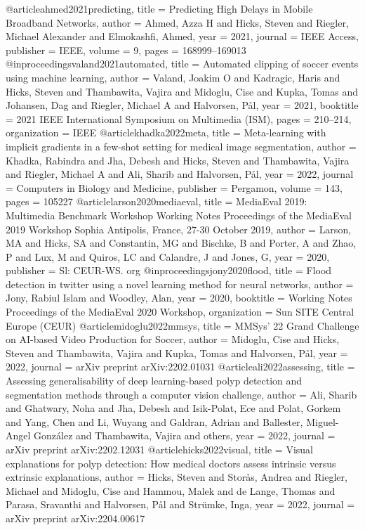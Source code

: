 @article{ahmed2021predicting,
	title = {Predicting High Delays in Mobile Broadband Networks},
	author = {Ahmed, Azza H and Hicks, Steven and Riegler, Michael Alexander and Elmokashfi, Ahmed},
	year = 2021,
	journal = {IEEE Access},
	publisher = {IEEE},
	volume = 9,
	pages = {168999--169013}
}
@inproceedings{valand2021automated,
	title = {Automated clipping of soccer events using machine learning},
	author = {Valand, Joakim O and Kadragic, Haris and Hicks, Steven and Thambawita, Vajira and Midoglu, Cise and Kupka, Tomas and Johansen, Dag and Riegler, Michael A and Halvorsen, P{\aa}l},
	year = 2021,
	booktitle = {2021 IEEE International Symposium on Multimedia (ISM)},
	pages = {210--214},
	organization = {IEEE}
}
@article{khadka2022meta,
	title = {Meta-learning with implicit gradients in a few-shot setting for medical image segmentation},
	author = {Khadka, Rabindra and Jha, Debesh and Hicks, Steven and Thambawita, Vajira and Riegler, Michael A and Ali, Sharib and Halvorsen, P{\aa}l},
	year = 2022,
	journal = {Computers in Biology and Medicine},
	publisher = {Pergamon},
	volume = 143,
	pages = 105227
}
@article{larson2020mediaeval,
	title = {MediaEval 2019: Multimedia Benchmark Workshop Working Notes Proceedings of the MediaEval 2019 Workshop Sophia Antipolis, France, 27-30 October 2019},
	author = {Larson, MA and Hicks, SA and Constantin, MG and Bischke, B and Porter, A and Zhao, P and Lux, M and Quiros, LC and Calandre, J and Jones, G},
	year = 2020,
	publisher = {Sl: CEUR-WS. org}
}
@inproceedings{jony2020flood,
	title = {Flood detection in twitter using a novel learning method for neural networks},
	author = {Jony, Rabiul Islam and Woodley, Alan},
	year = 2020,
	booktitle = {Working Notes Proceedings of the MediaEval 2020 Workshop},
	organization = {Sun SITE Central Europe (CEUR)}
}
@article{midoglu2022mmsys,
	title = {MMSys' 22 Grand Challenge on AI-based Video Production for Soccer},
	author = {Midoglu, Cise and Hicks, Steven and Thambawita, Vajira and Kupka, Tomas and Halvorsen, P{\aa}l},
	year = 2022,
	journal = {arXiv preprint arXiv:2202.01031}
}
@article{ali2022assessing,
	title = {Assessing generalisability of deep learning-based polyp detection and segmentation methods through a computer vision challenge},
	author = {Ali, Sharib and Ghatwary, Noha and Jha, Debesh and Isik-Polat, Ece and Polat, Gorkem and Yang, Chen and Li, Wuyang and Galdran, Adrian and Ballester, Miguel-Angel Gonz{\'a}lez and Thambawita, Vajira and others},
	year = 2022,
	journal = {arXiv preprint arXiv:2202.12031}
}
@article{hicks2022visual,
	title = {Visual explanations for polyp detection: How medical doctors assess intrinsic versus extrinsic explanations},
	author = {Hicks, Steven and Stor{\aa}s, Andrea and Riegler, Michael and Midoglu, Cise and Hammou, Malek and de Lange, Thomas and Parasa, Sravanthi and Halvorsen, P{\aa}l and Str{\"u}mke, Inga},
	year = 2022,
	journal = {arXiv preprint arXiv:2204.00617}
}
